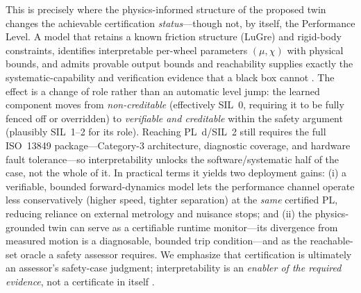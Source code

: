 \documentclass[11pt]{article}
\begin{document}
This is precisely where the physics-informed structure of the proposed twin changes
the achievable certification \emph{status}---though not, by itself, the Performance
Level. A model that retains a known friction structure (LuGre) and rigid-body
constraints, identifies interpretable per-wheel parameters $(\mu,\chi)$ with physical
bounds, and admits provable output bounds and reachability supplies exactly the
systematic-capability and verification evidence that a black box cannot
\cite{ozmen2026lugre,wang2025kan}. The effect is a change of role rather than an
automatic level jump: the learned component moves from \emph{non-creditable}
(effectively SIL~0, requiring it to be fully fenced off or overridden) to
\emph{verifiable and creditable} within the safety argument (plausibly SIL~1--2 for
its role). Reaching PL~d/SIL~2 still requires the full ISO~13849 package---Category-3
architecture, diagnostic coverage, and hardware fault tolerance---so interpretability
unlocks the software/systematic half of the case, not the whole of it. In practical
terms it yields two deployment gains: (i) a verifiable, bounded forward-dynamics
model lets the performance channel operate less conservatively (higher speed, tighter
separation) at the \emph{same} certified PL, reducing reliance on external metrology
and nuisance stops; and (ii) the physics-grounded twin can serve as a certifiable
runtime monitor---its divergence from measured motion is a diagnosable, bounded
trip condition---and as the reachable-set oracle a safety assessor requires. We
emphasize that certification is ultimately an assessor's safety-case judgment;
interpretability is an \emph{enabler of the required evidence}, not a certificate in
itself \cite{zhang2020nnverif,certifyml2022}.


\end{document}
